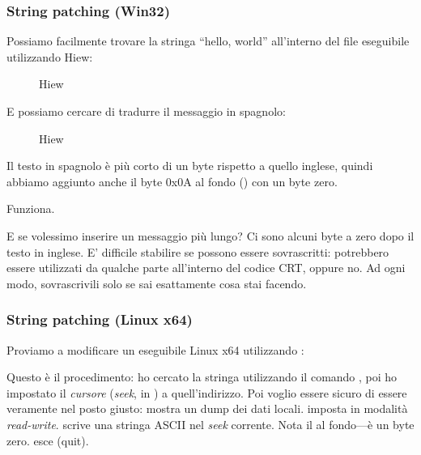 \subsubsection{String patching (Win32)}

Possiamo facilmente trovare la stringa ``hello, world'' all'interno del file eseguibile utilizzando Hiew:

\begin{figure}[H]
\centering
{}
\caption{Hiew}
\label{}
\end{figure}

E possiamo cercare di tradurre il messaggio in spagnolo:

\begin{figure}[H]
\centering
{}
\caption{Hiew}
\label{}
\end{figure}

Il testo in spagnolo è più corto di un byte rispetto a quello inglese, quindi abbiamo aggiunto anche il byte 0x0A al fondo () con un byte zero.

Funziona.

E se volessimo inserire un messaggio più lungo?
Ci sono alcuni byte a zero dopo il testo in inglese.
E' difficile stabilire se possono essere sovrascritti: potrebbero essere utilizzati da qualche parte all'interno del codice \ac{CRT}, oppure no.
Ad ogni modo, sovrascrivili solo se sai esattamente cosa stai facendo.

\subsubsection{String patching (Linux x64)}

\myindex{\radare}
Proviamo a modificare un eseguibile Linux x64 utilizzando \radare{}:



Questo è il procedimento: ho cercato la stringa  utilizzando il comando \TT{/},
poi ho impostato il \emph{cursore} (\emph{seek}, in \radare{}) a quell'indirizzo.
Poi voglio essere sicuro di essere veramente nel posto giusto:  mostra un dump dei dati locali.
 imposta \radare{} in modalità \emph{read-write}.
 scrive una stringa ASCII nel \emph{seek} corrente.
Nota il  al fondo---è un byte zero.
 esce (quit).

%

